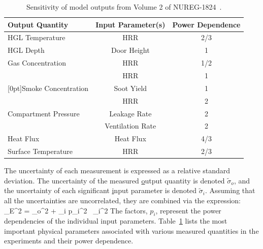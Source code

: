 \begin{table}[ht]
\caption{Sensitivity of model outputs from Volume 2 of NUREG-1824~\cite{NUREG_1824}. }
\begin{center}
\begin{tabular}{|l|c|c|}
\hline
Output Quantity                                 & Input Parameter(s)    & Power Dependence \\ \hline \hline
HGL Temperature                                 & HRR                   & 2/3    \\ \hline
HGL Depth                                       & Door Height           & 1      \\ \hline
Gas Concentration                               & HRR                   & 1/2    \\ \hline
                                                & HRR                   & 1      \\ \cline{2-3}
\raisebox{1.5ex}[0pt]{Smoke Concentration}      & Soot Yield            & 1      \\ \hline
                                                & HRR                   & 2      \\ \cline{2-3}
Compartment Pressure                            & Leakage Rate          & 2      \\ \cline{2-3}
                                                & Ventilation Rate      & 2      \\ \hline
Heat Flux                                       & Heat Flux             & 4/3    \\ \hline
Surface Temperature                             & HRR                   & 2/3    \\ \hline
\end{tabular}
\end{center}
\label{Parameter_Uncertainty}
\end{table}

The uncertainty of each measurement is expressed as a relative standard deviation. The uncertainty of the measured
\underline{o}utput quantity is denoted $\widetilde{\sigma}_o$, and the uncertainty of each
significant \underline{i}nput parameter is denoted $\widetilde{\sigma}_i$.
Assuming that all the uncertainties are uncorrelated, they are combined via the expression:
\be
   \widetilde{\sigma}_E^2 = \widetilde{\sigma}_o^2 + \sum_i p_i^2 \, \widetilde{\sigma}_i^2  \label{comb_unc}
\ee
The factors, $p_i$, represent the power dependencies of the individual input parameters.
Table~\ref{Parameter_Uncertainty} lists the most important physical parameters associated with various
measured quantities in the experiments and their power dependence.


